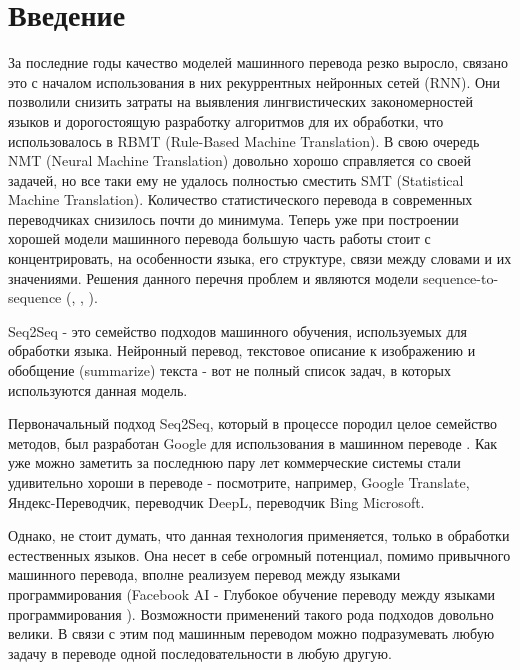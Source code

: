 



	
	
	
	\section{Введение}
	
	За последние годы качество моделей машинного перевода резко выросло, связано это с началом использования в них рекуррентных нейронных сетей (RNN). Они позволили снизить затраты на выявления лингвистических закономерностей языков и дорогостоящую разработку алгоритмов для их обработки, что использовалось в RBMT (Rule-Based Machine Translation). В свою очередь NMT (Neural Machine Translation) довольно хорошо справляется со своей задачей, но все таки ему не удалось полностью сместить SMT (Statistical Machine Translation). Количество статистического перевода в современных переводчиках снизилось почти до минимума. Теперь уже при построении хорошей модели машинного перевода большую часть работы стоит с концентрировать, на особенности языка, его структуре, связи между словами и их значениями. Решения данного перечня проблем и являются модели sequence-to-sequence (\cite{10}, \cite{11}, \cite{12}).
	
	Seq2Seq - это семейство подходов машинного обучения, используемых для обработки языка. Нейронный перевод, текстовое описание к изображению и обобщение (summarize) текста - вот не полный список задач, в которых используются данная модель.
	
	Первоначальный подход Seq2Seq, который в процессе породил целое семейство методов, был разработан Google для использования в машинном переводе \cite{21}. Как уже можно заметить за последнюю пару лет коммерческие системы стали удивительно хороши в переводе - посмотрите, например, Google Translate, Яндекс-Переводчик, переводчик DeepL, переводчик Bing Microsoft.
	
	Однако, не стоит думать, что данная технология применяется, только в обработки естественных языков. Она несет в себе огромный потенциал, помимо привычного машинного перевода, вполне реализуем перевод между языками программирования (Facebook AI - Глубокое обучение переводу между языками программирования \cite{19}). Возможности применений такого рода подходов довольно велики. В связи с этим под машинным переводом можно подразумевать любую задачу в переводе одной последовательности в любую другую.
	
	\clearpage
	
